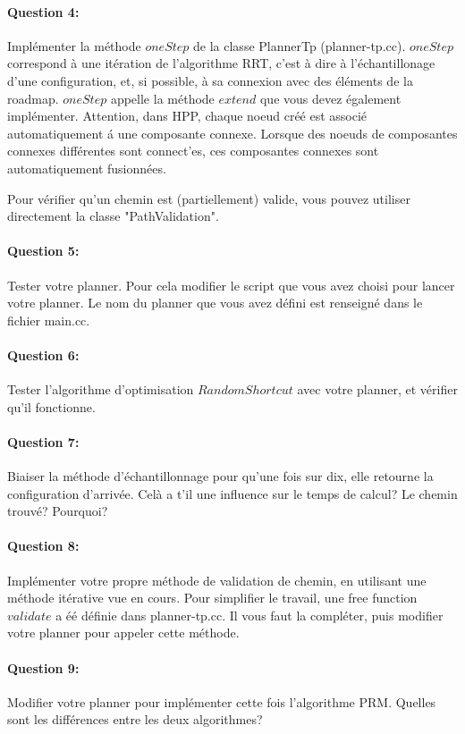 \documentclass {article}
\begin{document}
\paragraph {Question 4:}
Impl\'ementer la m\'ethode $oneStep$ de la classe PlannerTp (planner-tp.cc).
$oneStep$ correspond \`a une it\'eration de l'algorithme RRT, c'est \`a dire \`a l'\'echantillonage d'une configuration,
et, si possible, \`a sa connexion avec des \'el\'ements de la roadmap.
$oneStep$ appelle la m\'ethode $extend$ que vous devez \'egalement impl\'ementer.
Attention, dans HPP, chaque noeud cr\'e\'e est associ\'e automatiquement \'a une composante connexe.
Lorsque des noeuds de composantes connexes diff\'erentes sont connect'es, ces composantes connexes sont automatiquement
fusionn\'ees.

Pour v\'erifier qu'un chemin est (partiellement) valide, vous pouvez utiliser directement la classe
"PathValidation".

\paragraph {Question 5:}
Tester votre planner. Pour cela modifier le script que vous avez choisi pour lancer votre planner.
Le nom du planner que vous avez d\'efini est renseign\'e dans le fichier main.cc.

\paragraph {Question 6:}
Tester l'algorithme d'optimisation $RandomShortcut$ avec votre planner, et v\'erifier qu'il fonctionne.

\paragraph {Question 7:}
Biaiser la m\'ethode d'\'echantillonnage pour qu'une fois sur dix, elle retourne la configuration d'arriv\'ee.
Cel\`a a t'il une influence sur le temps de calcul? Le chemin trouv\'e?
Pourquoi?

\paragraph{Question 8:}
Impl\'ementer votre propre m\'ethode de validation de chemin, en utilisant une m\'ethode it\'erative
vue en cours. Pour simplifier le travail, une free function $validate$ a \'e\'e d\'efinie dans planner-tp.cc.
Il vous faut la compl\'eter, puis modifier votre planner pour appeler cette m\'ethode.

\paragraph{Question 9:}
Modifier votre planner pour impl\'ementer cette fois l'algorithme PRM.
Quelles sont les diff\'erences entre les deux algorithmes?
\end{document}
